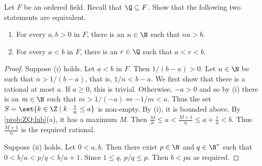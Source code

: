 \documentclass[12pt]{article}
\begin{document}
\begin{problem}
    Let $F$ be an ordered field.
    Recall that $\Q \subseteq F$.
    Show that the following two statements are equivalent.
    \begin{enumerate}
        \item For every $a, b > 0$ in $F$, there is an $n \in \N$ such that
            $na > b$.
        \item For every $a < b$ in $F$, there is an $r \in \Q$ such that
            $a < r < b$.
    \end{enumerate}
\end{problem}
\begin{proof}
    Suppose (i) holds.
    Let $a < b$ in $F$.
    Then $1 / (b - a) > 0$.
    Let $n \in \N$ be such that $n > 1 / (b - a)$, that is, $1/n < b - a$.
    We first show that there is a rational at most $a$.
    If $a \ge 0$, this is trivial.
    Otherwise, $-a > 0$ and so by (i) there is an $m \in \N$ such that
    $m > 1 / (-a) \iff -1 / m < a$.
    Thus the set $S = \set{k \in \Z \mid k \cdot \frac1n \le a}$ is non-empty.
    By (i), it is bounded above.
    By \cref{prob:ZQ:lub}(a), it has a maximum $M$.
    Then $\frac{M}{n} \le a < \frac{M + 1}{n} \le a + \frac1n < b$.
    Thus $\frac{M + 1}{n}$ is the required rational.

    Suppose (ii) holds.
    Let $0 < a, b$.
    Then there exist $p \in \N$ and $q \in \N^*$ such that
    $0 < b/a < p/q < b/a + 1$.
    Since $1 \le q$, $p/q \le p$.
    Then $b < pa$ as required.
\end{proof}
\end{document}
